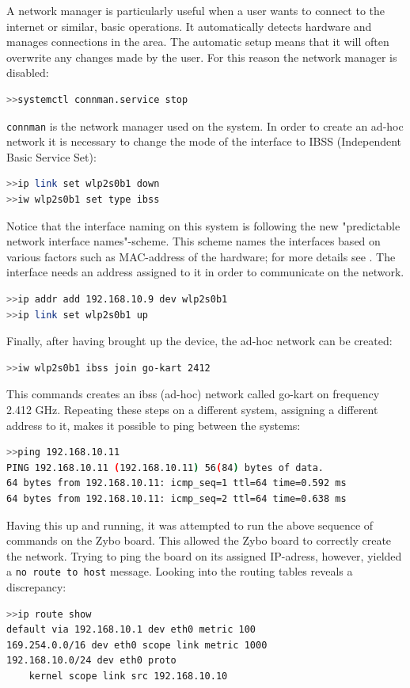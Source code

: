 A network manager is particularly useful when a user wants to connect to the internet or similar, basic operations.
It automatically detects hardware and manages connections in the area.
The automatic setup means that it will often overwrite any changes made by the user.
For this reason the network manager is disabled:
\begin{lstlisting}[language=bash]
>>systemctl connman.service stop
\end{lstlisting}
\texttt{connman} is the network manager used on the system.
In order to create an ad-hoc network it is necessary to change the mode of the interface to IBSS (Independent Basic Service Set):
\begin{lstlisting}[language=bash]
>>ip link set wlp2s0b1 down
>>iw wlp2s0b1 set type ibss
\end{lstlisting}
Notice that the interface naming on this system is following the new "predictable network interface names"-scheme.
This scheme names the interfaces based on various factors such as MAC-address of the hardware; for more details see \cite{interfacenaming}.
The interface needs an address assigned to it in order to communicate on the network.
\begin{lstlisting}[language=bash]
>>ip addr add 192.168.10.9 dev wlp2s0b1
>>ip link set wlp2s0b1 up
\end{lstlisting}
Finally, after having brought up the device, the ad-hoc network can be created:
\begin{lstlisting}[language=bash]
>>iw wlp2s0b1 ibss join go-kart 2412
\end{lstlisting}
This commands creates an ibss (ad-hoc) network called go-kart on frequency 2.412 \si{\giga\hertz}.
Repeating these steps on a different system, assigning a different address to it, makes it possible to ping between the systems: 
\begin{lstlisting}[language=bash]
>>ping 192.168.10.11
PING 192.168.10.11 (192.168.10.11) 56(84) bytes of data.
64 bytes from 192.168.10.11: icmp_seq=1 ttl=64 time=0.592 ms
64 bytes from 192.168.10.11: icmp_seq=2 ttl=64 time=0.638 ms
\end{lstlisting}
Having this up and running, it was attempted to run the above sequence of commands on the Zybo board.
This allowed the Zybo board to correctly create the network.
Trying to ping the board on its assigned IP-adress, however, yielded a \texttt{no route to host} message.
Looking into the routing tables reveals a discrepancy:
\begin{lstlisting}[language=bash]
>>ip route show
default via 192.168.10.1 dev eth0 metric 100 
169.254.0.0/16 dev eth0 scope link metric 1000 
192.168.10.0/24 dev eth0 proto 
	kernel scope link src 192.168.10.10 
\end{lstlisting}
